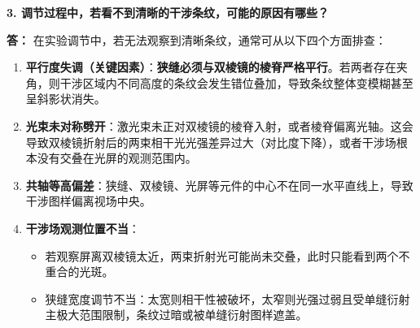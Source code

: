 \documentclass[]{../template/Report}%
\begin{document}
\begin{fullreportonly}
\medskip
\textbf{3. 调节过程中，若看不到清晰的干涉条纹，可能的原因有哪些？}

\noindent\textbf{答：}
在实验调节中，若无法观察到清晰条纹，通常可从以下四个方面排查：
\begin{enumerate}
    \item \textbf{平行度失调（关键因素）}：\textbf{狭缝必须与双棱镜的棱脊严格平行}。若两者存在夹角，则干涉区域内不同高度的条纹会发生错位叠加，导致条纹整体变模糊甚至呈斜影状消失。
    \item \textbf{光束未对称劈开}：激光束未正对双棱镜的棱脊入射，或者棱脊偏离光轴。这会导致双棱镜折射后的两束相干光光强差异过大（对比度下降），或者干涉场根本没有交叠在光屏的观测范围内。
    \item \textbf{共轴等高偏差}：狭缝、双棱镜、光屏等元件的中心不在同一水平直线上，导致干涉图样偏离视场中央。
    \item \textbf{干涉场观测位置不当}：
    \begin{itemize}
        \item 若观察屏离双棱镜太近，两束折射光可能尚未交叠，此时只能看到两个不重合的光斑。
        \item 狭缝宽度调节不当：太宽则相干性被破坏，太窄则光强过弱且受单缝衍射主极大范围限制，条纹过暗或被单缝衍射图样遮盖。
    \end{itemize}
\end{enumerate}

\end{fullreportonly}
\insertnotes
\end{document}
